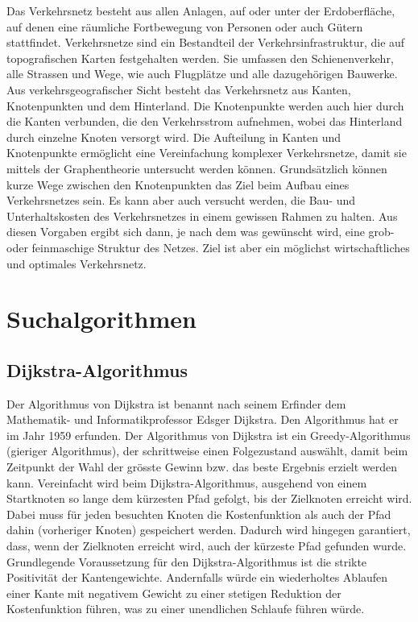 \label{section:verkehr/einfuehrung}

Das Verkehrsnetz besteht aus allen Anlagen, auf oder unter der Erdoberfläche, auf denen eine räumliche Fortbewegung von Personen oder auch Gütern stattfindet. Verkehrsnetze sind ein Bestandteil der Verkehrsinfrastruktur, die auf topografischen Karten festgehalten werden. Sie umfassen den Schienenverkehr, alle Strassen und Wege, wie auch Flugplätze und alle dazugehörigen Bauwerke.
Aus verkehrsgeografischer Sicht besteht das Verkehrsnetz aus Kanten, Knotenpunkten und dem Hinterland. Die Knotenpunkte werden auch hier durch die Kanten verbunden, die den Verkehrsstrom aufnehmen, wobei das Hinterland durch einzelne Knoten versorgt wird. Die Aufteilung in Kanten und Knotenpunkte ermöglicht eine Vereinfachung komplexer Verkehrsnetze, damit sie mittels der Graphentheorie untersucht werden können.
Grundsätzlich können kurze Wege zwischen den Knotenpunkten das Ziel beim Aufbau eines Verkehrsnetzes sein. Es kann aber auch versucht werden, die Bau- und Unterhaltskosten des Verkehrsnetzes in einem gewissen Rahmen zu halten. Aus diesen Vorgaben ergibt sich dann, je nach dem was gewünscht wird, eine grob- oder feinmaschige Struktur des Netzes.
Ziel ist aber ein möglichst wirtschaftliches und optimales Verkehrsnetz.

\section{Suchalgorithmen}

\subsection{Dijkstra-Algorithmus}
Der Algorithmus von Dijkstra ist benannt nach seinem Erfinder dem Mathematik- und Informatikprofessor Edsger Dijkstra. Den Algorithmus hat er im Jahr 1959 erfunden.
Der Algorithmus von Dijkstra ist ein Greedy-Algorithmus (gieriger Algorithmus), der schrittweise einen Folgezustand auswählt, damit beim Zeitpunkt der Wahl der grösste Gewinn bzw. das beste Ergebnis erzielt werden kann.
Vereinfacht wird beim Dijkstra-Algorithmus, ausgehend von einem Startknoten so lange dem kürzesten Pfad gefolgt, bis der Zielknoten erreicht wird. Dabei muss für jeden besuchten Knoten die Kostenfunktion als auch der Pfad dahin (vorheriger Knoten) gespeichert werden.
Dadurch wird hingegen garantiert, dass, wenn der Zielknoten erreicht wird, auch der kürzeste Pfad gefunden wurde.
Grundlegende Voraussetzung für den Dijkstra-Algorithmus ist die strikte Positivität der Kantengewichte. Andernfalls würde ein wiederholtes Ablaufen einer Kante mit negativem Gewicht zu einer stetigen Reduktion der Kostenfunktion führen, was zu einer unendlichen Schlaufe führen würde.

